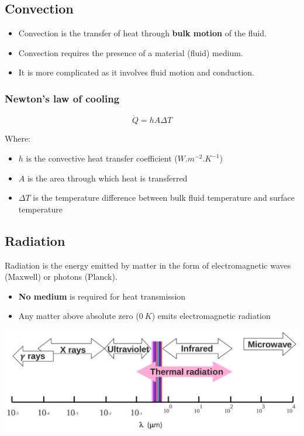 \documentclass[11pt]{article}
\begin{document}
 \newpage

\subsection{Convection}
\label{sec:org3ad1dee}
\begin{itemize}
\item Convection is the transfer of heat through \textbf{bulk motion} of the fluid.
\item Convection requires the presence of a material (fluid) medium.
\item It is more complicated as it involves fluid motion and conduction.
\end{itemize}

\subsubsection{Newton's law of cooling}
\label{sec:org84c795b}
\[\dot{Q} = hA \Delta T\]

Where:
\begin{itemize}
\item \(h\) is the convective heat transfer coefficient (\(\unit{W.m^{-2}.K^{-1}}\))
\item \(A\) is the area through which heat is transferred
\item \(\Delta T\) is the temperature difference between bulk fluid temperature and surface temperature
\end{itemize}

\subsection{Radiation}
\label{sec:orgb388c2f}
Radiation is the energy emitted by matter in the form of electromagnetic waves (Maxwell) or photons (Planck).
\begin{itemize}
\item \textbf{No medium} is required for heat transmission
\item Any matter above absolute zero (\(\qty{0}{K}\)) emits electromagnetic radiation
\end{itemize}

\begin{center}
\includegraphics[width=.9\linewidth]{./images/electromagnetic-spectrum-for-thermal-radiation.png}
\end{center}
\end{document}
